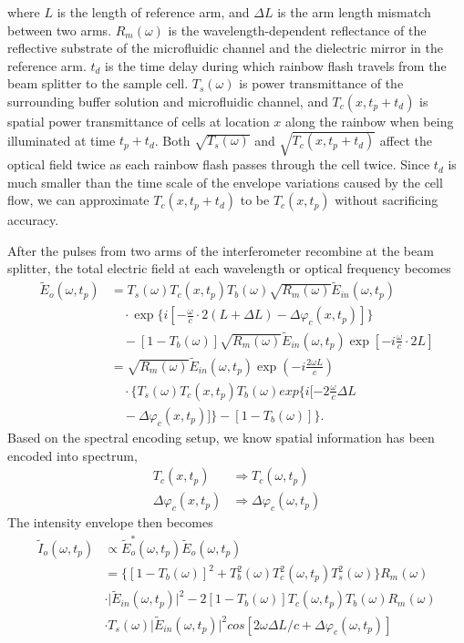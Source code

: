 \documentclass[aps,pra,reprint,superscriptaddress]{revtex4-1}
\begin{document}
where $L$ is the length of reference arm, and $\Delta L$ is the arm length mismatch between two arms. $R_m(\omega)$ is the wavelength-dependent reflectance of the reflective substrate of the microfluidic channel and the dielectric mirror in the reference arm. $t_d$ is the time delay during which rainbow flash travels from the beam splitter to the sample cell. $T_s(\omega)$ is power transmittance of the surrounding buffer solution and microfluidic channel, and $T_c(x,t_p + t_d)$ is spatial power transmittance of cells at location $x$ along the rainbow when being illuminated at time $t_p + t_d$. Both $\sqrt{T_s(\omega)}$ and $\sqrt{T_c(x,t_p + t_d)}$ affect the optical field twice as each rainbow flash passes through the cell twice. Since $t_d$ is much smaller than the time scale of the envelope variations caused by the cell flow, we can approximate $T_c(x,t_p + t_d)$ to be $T_c(x,t_p)$ without sacrificing accuracy.

After the pulses from two arms of the interferometer recombine at the beam splitter, the total electric field at each wavelength or optical frequency becomes
\begin{equation} \label{eq:totalElecField}
\begin{split}
\tilde{E}_o(\omega, t_p) &= T_s(\omega) T_c(x, t_p) T_b(\omega) \sqrt{R_m(\omega)} \tilde{E}_{in}(\omega, t_p) \\
&\quad \cdot \exp \Big\lbrace i[-\frac{\omega}{c} \cdot 2(L+\Delta L) - \Delta\varphi_c(x,t_p)] \Big\rbrace \\
&\quad - [1-T_b(\omega)] \sqrt{R_m(\omega)} \tilde{E}_{in}(\omega, t_p) \exp[- i \frac{\omega}{c}\cdot 2L] \\
&= \sqrt{R_m(\omega)} \tilde{E}_{in}(\omega, t_p) \exp(- i \frac{2\omega L}{c}) \\
&\quad \cdot \Big\lbrace T_s(\omega) T_c(x, t_p) T_b(\omega) exp \lbrace i[-2\frac{\omega}{c}\Delta L  \\
&\quad - \Delta\varphi_c(x,t_p)] \rbrace - [1-T_b(\omega)] \Big\rbrace.
\end{split}
\end{equation}
Based on the spectral encoding setup, we know spatial information has been encoded into spectrum,
\begin{align}
T_c(x,t_p) &\Rightarrow T_c(\omega,t_p)\\
\Delta\varphi_c(x,t_p) &\Rightarrow \Delta\varphi_c(\omega,t_p)
\end{align}
The intensity envelope then becomes
\begin{equation} \label{eq:totalIntensity}
\begin{split}
\tilde{I}_o(\omega, t_p) &\propto \tilde{E}_o^*(\omega, t_p) \tilde{E}_o(\omega, t_p) \\
&= \Big\lbrace [1-T_b(\omega)]^2 + T_b^2(\omega) T_c^2(\omega, t_p) T_s^2(\omega) \Big\rbrace R_m(\omega) \\
& \cdot \lvert\tilde{E}_{in}(\omega, t_p)\rvert^2 - 2 [1-T_b(\omega)] T_c(\omega, t_p) T_b(\omega) R_m(\omega) \\
& \cdot T_s(\omega) \lvert\tilde{E}_{in}(\omega, t_p)\rvert^2 cos[2\omega \Delta L / c + \Delta \varphi_c(\omega, t_p) ]
\end{split}
\end{equation}
\end{document}
